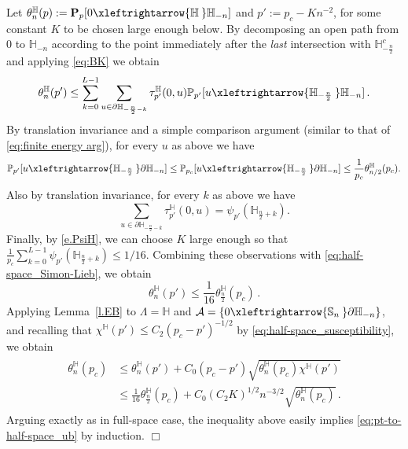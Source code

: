 \documentclass[11pt,a4paper]{article}
\numberwithin{equation}{section}
\theoremstyle{plain}
\theoremstyle{definition}
\newcommand{\connect}{\xleftrightarrow}
\newcommand{\QED}{\hfill \ensuremath{\Box}}
\let\qed=\QED
\newcommand{\1}{\mathbf 1}
\def\H{\mathbb{H}}
\begin{document}
Let $\theta^\H_n(p):= \mathbf{P}_{p}[0\connect{\H\:}  \H_{-n}]$ and $p':=p_c-Kn^{-2}$, for some constant $K$ to be chosen large enough below.
By decomposing an open path from $0$ to $\mathbb H_{-n}$ according to the point immediately after the \emph{last} intersection with $\H_{-\frac{n}{2}}^c$ and applying \eqref{eq:BK} we obtain
\begin{equation}\label{eq:half-space_Simon-Lieb}
	\theta_n^{\H}(p') \leq \sum_{k=0}^{L-1} \sum_{u\in \partial \H_{-\frac{n}{2} - k}} \tau^{\H}_{p'}(0,u) \mathbb{P}_{p'}[u \connect{\H_{-\frac{n}{2}}\:} \H_{-n}] \,.
\end{equation}
By translation invariance and a simple comparison argument (similar to that of \eqref{eq:finite energy arg}), for every $u$ as above we have 
\begin{equation}	
\mathbb{P}_{p'}[u \connect{\H_{-\frac{n}{2}}\:} \partial \H_{-n}]\leq \mathbb{P}_{p_c}[u \connect{\H_{-\frac{n}{2}}\:} \partial \H_{-n}] \leq \frac{1}{p_c} \theta^{\H}_{n/2}(p_c).
\end{equation}
Also by translation invariance, for every $k$ as above we have 
\begin{equation}
\sum_{u\in\partial \H_{-\frac{n}{2} - k}} \tau^{\H}_{p'}(0,u) = \psi_{p'}(\H_{\frac{n}{2} + k}).
\end{equation} 
Finally, by \eqref{e.PsiH}, we can choose $K$ large enough so that $\frac{1}{p_c} \sum_{k=0}^{L-1} \psi_{p'}(\H_{\frac{n}{2} + k})\leq 1/16$. 
Combining these observations with \eqref{eq:half-space_Simon-Lieb}, we obtain
\begin{equation}\label{eq:half-space_Simon-Lieb2}
	\theta_n^{\H}(p') \leq \frac{1}{16} \theta^{\H}_{\frac{n}{2}}(p_c) \,.
\end{equation}
Applying Lemma~\ref{l.EB} to $\Lambda=\mathbb H$ and $\mathcal A=\{0\connect{\mathbb S_n\:}\partial \H_{-n}\}$, and recalling that $\chi^\H(p')\leq C_2(p_c-p')^{-1/2}$ by \eqref{eq:half-space_susceptibility}, we obtain
\begin{align}\label{}
\begin{split}
	\theta_n^{\H}(p_c) &\leq \theta_n^\H(p')+C_0  (p_c - p')  \sqrt{\theta_n^\H(p_c) \chi^\H(p')} \\ 
	&\leq \frac{1}{16} \theta^{\H}_{\frac{n}{2}}(p_c) + C_0 (C_2K)^{1/2} n^{-3/2}  \sqrt{\theta_n^\H(p_c)} \,.
\end{split}
\end{align}
Arguing exactly as in full-space case, the inequality above easily implies \eqref{eq:pt-to-half-space_ub} by induction. \qed
\end{document}
